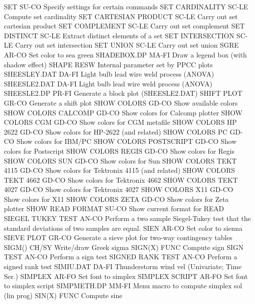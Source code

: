 SET                         SU-CO Specify settings for certain commands
SET CARDINALITY             SC-LE Compute set cardinality
SET CARTESIAN PRODUCT       SC-LE Carry out set cartesian product
SET COMPLEMENT              SC-LE Carry out set complement
SET DISTINCT                SC-LE Extract distinct elements of a set
SET INTERSECTION            SC-LE Carry out set intersection
SET UNION                   SC-LE Carry out set union
SGRE                        AR-CO Set color to sea green
SHADEBOX.DP                 MA-FI Draw a legend box (with shadow effect)
SHAPE                       RESW  Internal parameter set by PPCC plots
SHEESLEY.DAT                DA-FI Light bulb lead wire weld process (ANOVA)
SHEESLE2.DAT                DA-FI Light bulb lead wire weld process (ANOVA)
SHEESLE2.DP                 PR-FI Generate a block plot (SHEESLE2.DAT)
SHIFT PLOT                  GR-CO Generate a shift plot
SHOW COLORS                 GD-CO Show available colors
SHOW COLORS CALCOMP         GD-CO Show colors for Calcomp plotter
SHOW COLORS CGM             GD-CO Show colors for CGM metafile
SHOW COLORS HP 2622         GD-CO Show colors for HP-2622 (and related)
SHOW COLORS PC              GD-CO Show colors for IBM/PC
SHOW COLORS POSTSCRIPT      GD-CO Show colors for Postscript
SHOW COLORS REGIS           GD-CO Show colors for Regis
SHOW COLORS SUN             GD-CO Show colors for Sun
SHOW COLORS TEKT 4115       GD-CO Show colors for Tektronix 4115 (and related)
SHOW COLORS TEKT 4662       GD-CO Show colors for Tektronix 4662
SHOW COLORS TEKT 4027       GD-CO Show colors for Tektronix 4027
SHOW COLORS X11             GD-CO Show colors for X11
SHOW COLORS ZETA            GD-CO Show colors for Zeta plotter
SHOW READ FORMAT            SU-CO Show current format for READ
SIEGEL TUKEY TEST           AN-CO Perform a two sample Siegel-Tukey test that the standard deviations of two samples are equal.
SIEN                        AR-CO Set color to sienna
SIEVE PLOT                  GR-CO Generate a sieve plot for two-way contingency tables
SIGM()                      CH/SY Write/draw Greek sigma
SIGN(X)                     FUNC  Compute sign
SIGN TEST                   AN-CO Perform a sign test
SIGNED RANK TEST            AN-CO Perform a signed rank test
SIMIU.DAT                   DA-FI Thunderstorm wind vel (Univariate; Time Ser.)
SIMPLEX                     AR-FO Set font to simplex
SIMPLEX SCRIPT              AR-FO Set font to simplex script
SIMPMETH.DP                 MM-FI Menu macro to compute simplex sol (lin prog)
SIN(X)                      FUNC  Compute sine
